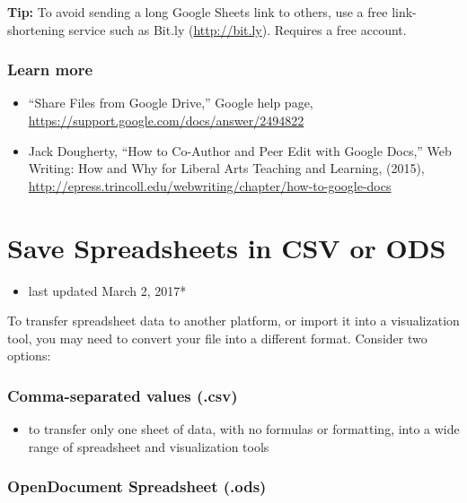 \documentclass[
  english,
]{book}
\providecommand{\tightlist}{%
  \setlength{\itemsep}{0pt}\setlength{\parskip}{0pt}}
\begin{document}
\textbf{Tip:} To avoid sending a long Google Sheets link to others, use a free link-shortening service such as Bit.ly (\url{http://bit.ly}). Requires a free account.

\hypertarget{learn-more-1}{%
\subsubsection*{Learn more}\label{learn-more-1}}

\begin{itemize}
\tightlist
\item
  ``Share Files from Google Drive,'' Google help page, \url{https://support.google.com/docs/answer/2494822}
\item
  Jack Dougherty, ``How to Co-Author and Peer Edit with Google Docs,'' Web Writing: How and Why for Liberal Arts Teaching and Learning, (2015), \url{http://epress.trincoll.edu/webwriting/chapter/how-to-google-docs}
\end{itemize}

\hypertarget{csv}{%
\section{Save Spreadsheets in CSV or ODS}\label{csv}}

\begin{itemize}
\tightlist
\item
  last updated March 2, 2017*
\end{itemize}

To transfer spreadsheet data to another platform, or import it into a visualization tool, you may need to convert your file into a different format. Consider two options:

\hypertarget{comma-separated-values-.csv}{%
\subsubsection*{Comma-separated values (.csv)}\label{comma-separated-values-.csv}}

\begin{itemize}
\tightlist
\item
  to transfer only one sheet of data, with no formulas or formatting, into a wide range of spreadsheet and visualization tools
\end{itemize}

\hypertarget{opendocument-spreadsheet-.ods}{%
\subsubsection*{OpenDocument Spreadsheet (.ods)}\label{opendocument-spreadsheet-.ods}}
\end{document}

